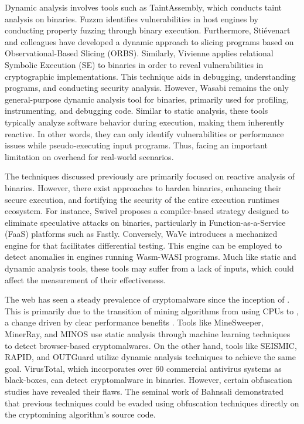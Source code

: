  Dynamic analysis involves tools such as TaintAssembly\cite{taintassembly}, which conducts taint analysis on \Wasm binaries. 
Fuzzm\cite{fuzzm} identifies vulnerabilities in host engines by conducting property fuzzing through \Wasm binary execution. 
Furthermore, Stiévenart and colleagues have developed a dynamic approach to slicing \Wasm programs based on Observational-Based Slicing (ORBS)\cite{slicing, slicing2}.
Similarly, Vivienne applies relational Symbolic Execution (SE) to \Wasm binaries in order to reveal vulnerabilities in cryptographic implementations\cite{Vivienne}. 
This technique aids in debugging, understanding programs, and conducting security analysis.
However, Wasabi\cite{wasabi} remains the only general-purpose dynamic analysis tool for \Wasm binaries, primarily used for profiling, instrumenting, and debugging \Wasm code. 
Similar to static analysis, these tools typically analyze software behavior during execution, making them inherently reactive. 
In other words, they can only identify vulnerabilities or performance issues while pseudo-executing input \wasm programs.
Thus, facing an important limitation on overhead for real-world scenarios. 

The techniques discussed previously are primarily focused on reactive analysis of \Wasm binaries.
However, there exist approaches to harden \Wasm binaries, enhancing their secure execution, and fortifying the security of the entire execution runtimes ecosystem. 
For instance, Swivel\cite{Swivel} proposes a compiler-based strategy designed to eliminate speculative attacks on \Wasm binaries, particularly in Function-as-a-Service (FaaS) platforms such as Fastly. 
Conversely, WaVe\cite{wave} introduces a mechanized engine for \Wasm that facilitates differential testing. 
This engine can be employed to detect anomalies in engines running Wasm-WASI programs. 
Much like static and dynamic analysis tools, these tools may suffer from a lack of \Wasm inputs, which could affect the measurement of their effectiveness.


 The web has seen a steady prevalence of cryptomalware since the inception of \wasm. 
This is primarily due to the transition of mining algorithms from using CPUs to \wasm, a change driven by clear performance benefits \cite{musch2019new}. 
Tools like MineSweeper\cite{Minesweeper}, MinerRay\cite{MinerRay}, and MINOS\cite{MINOS} use static analysis through machine learning techniques to detect browser-based cryptomalwares. 
On the other hand, tools like SEISMIC\cite{SEISMIC}, RAPID\cite{RAPID}, and OUTGuard\cite{outguard} utilize dynamic analysis techniques to achieve the same goal.
VirusTotal, which incorporates over 60 commercial antivirus systems as black-boxes, can detect cryptomalware in \wasm binaries.
However, certain obfuscation studies have revealed their flaws.
The seminal work of Bahnsali \etal \cite{10.1145/3507657.3528560} demonstrated that previous techniques could be evaded using obfuscation techniques directly on the cryptomining algorithm's source code.

